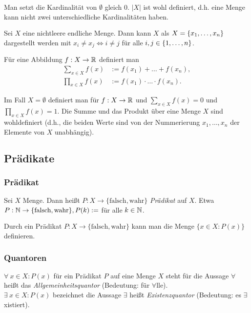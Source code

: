Man setzt die Kardinalität von $ \emptyset $ gleich 0. $ |X| $ ist wohl definiert, d.h. eine Menge kann nicht zwei unterschiedliche Kardinalitäten haben.

Sei $ X $ eine nichtleere endliche Menge. Dann kann $ X $ als $ X = \{ x_1,\ldots,x_n \} $ dargestellt werden mit  $ x_i \neq x_j \Leftrightarrow i \neq j $ für alle $ i,j \in \{ 1,\ldots,n \} $.

Für eine Abbildung $ f : X \to \mathbb R $ definiert man
\begin{align*}
	\sum\limits_{x \in X} f(x) &:= f(x_1) + \ldots + f(x_n),
\\
	\prod\limits_{x \in X} f(x) &:= f(x_1) \cdot \ldots \cdot f(x_n).
\end{align*}

Im Fall $ X = \emptyset $ definiert man für $ f : X \to \mathbb R $ und $ \sum\limits_{x \in X} f(x) = 0 $ und $ \prod\limits_{x \in X} f(x) = 1 $. Die Summe und das Produkt über eine Menge $X$ sind wohldefiniert (d.h., die beiden Werte sind von der Nummerierung $x_1,\ldots,x_n$ der Elemente von $X$ unabhängig).



\subsection{Prädikate}

\subsubsection{Prädikat}

Sei $ X $ Menge. Dann heißt $ P : X \to \{ \text{falsch},\text{wahr} \} $ \emph{Prädikat} auf $ X $. Etwa $ P : \mathbb N \to \{ \text{falsch},\text{wahr} \}, P(k) := $  für alle $ k \in \mathbb N $.

Durch ein Prädikat $ P : X \to \{ \text{falsch},\text{wahr} \} $ kann man die Menge $ \{ x \in X : P(x) \} $ definieren.

\subsubsection{Quantoren}

$ \forall\: x \in X : P(x) $ für ein Prädikat $ P $ auf eine Menge $ X $ steht für die Aussage  $ \forall $ heißt das \emph{Allgemeinheitsquantor} (Bedeutung: für $ \forall $lle). \\[10pt]
%
$ \exists\: x \in X : P(x) $ bezeichnet die Aussage  $ \exists $ heißt \emph{Existenzquantor} (Bedeutung: es $ \exists $xistiert).

